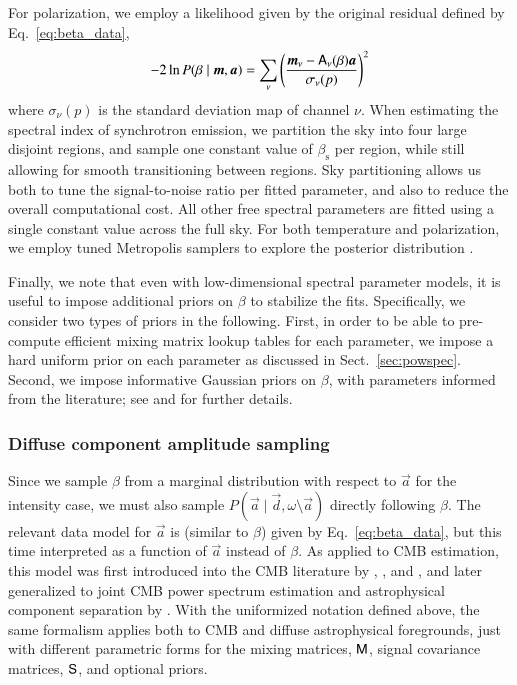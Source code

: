 \documentclass[onecolumn]{aa}
\renewcommand{\d}[0]{\vec{d}}
\newcommand{\A}[0]{\tens{A}}
\renewcommand{\a}[0]{\vec{a}}
\newcommand{\m}[0]{\vec{m}}
\newcommand{\M}[0]{\tens{M}}
\renewcommand{\S}[0]{\tens{S}}
\begin{document}
For polarization, we employ a likelihood given by the original
residual defined by Eq.~\eqref{eq:beta_data}, 
\begin{equation}
  -2\ln P(\beta\mid \m, \a) = \sum_{\nu}\left(\frac{\m_{\nu} - \A_{\nu}(\beta)\a}{\sigma_{\nu}(p)}\right)^2
\label{eq:beta_cond}
\end{equation}
where $\sigma_{\nu}(p)$ is the standard deviation map of channel
$\nu$.
When estimating the spectral index of synchrotron emission, we
partition the sky into four large disjoint regions, and sample one
constant value of $\beta_{\mathrm{s}}$ per region, while still
allowing for smooth transitioning between regions. Sky partitioning
allows us both to tune the signal-to-noise ratio per fitted parameter,
and also to reduce the overall computational cost. All other free
spectral parameters are fitted using a single constant value across
the full sky. For both temperature and polarization, we employ tuned
Metropolis samplers to explore the posterior distribution
\citep{bp13,bp14}.

Finally, we note that even with low-dimensional spectral parameter
models, it is useful to impose additional priors on $\beta$ to
stabilize the fits. Specifically, we consider two types of priors in
the following. First, in order to be able to pre-compute efficient
mixing matrix lookup tables for each parameter, we impose a hard
uniform prior on each parameter as discussed in
Sect.~\ref{sec:powspec}. Second, we impose informative Gaussian priors
on $\beta$, with parameters informed from the literature; see
\citet{bp13} and \citet{bp14} for further details.

\subsubsection{Diffuse component amplitude sampling}
\label{sec:sigamp}  

Since we sample $\beta$ from a marginal distribution with respect to
$\a$ for the intensity case, we must also sample $P(\a\mid \d,
\omega\setminus\a)$ directly following $\beta$. The relevant data
model for $\a$ is (similar to $\beta$) given by
Eq.~\eqref{eq:beta_data}, but this time interpreted as a function of
$\a$ instead of $\beta$. As applied to CMB estimation, this model was
first introduced into the CMB literature by
\citet{jewell2004}, 
\citet{wandelt2004},
and \citet{eriksen:2004}, and later generalized to
joint CMB power spectrum estimation and astrophysical component
separation by \citet{eriksen2008}. With the uniformized notation
defined above, the same formalism applies both to CMB and diffuse
astrophysical foregrounds, just with different parametric forms for
the mixing matrices, $\M$, signal covariance matrices, $\S$, and
optional priors.
\end{document}

